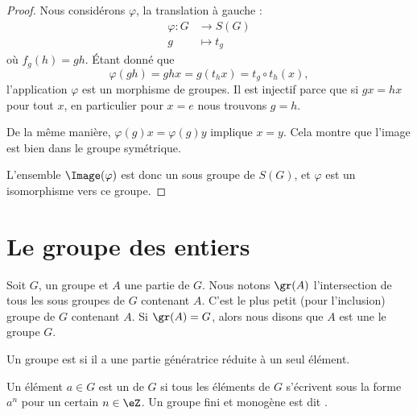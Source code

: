 \begin{proof}
    Nous considérons \( \varphi\), la translation à gauche :
    \begin{equation}
        \begin{aligned}
            \varphi\colon G&\to S(G) \\
            g&\mapsto t_g 
        \end{aligned}
    \end{equation}
    où \( f_g(h)=gh\). Étant donné que
    \begin{equation}
        \varphi(gh)= ghx=g(t_hx)=t_g\circ t_h(x),
    \end{equation}
    l'application \( \varphi\) est un morphisme de groupes. Il est injectif parce que si \( gx=hx\) pour tout \( x\), en particulier pour \( x=e\) nous trouvons \( g=h\). 
    
    De la même manière, \( \varphi(g)x=\varphi(g)y\) implique \( x=y\). Cela montre que l'image est bien dans le groupe symétrique.

    L'ensemble \( \Image(\varphi)\) est donc un sous groupe de \( S(G)\), et \( \varphi\) est un isomorphisme vers ce groupe.
\end{proof}

\section{Le groupe des entiers}

\begin{definition}
    Soit \( G\), un groupe et \( A\) une partie de \( G\). Nous notons \( \gr(A)\) l'intersection de tous les sous groupes de \( G\) contenant \( A\). C'est le plus petit (pour l'inclusion) groupe de \( G\) contenant \( A\). Si \( \gr(A)=G\), alors nous disons que \( A\) est une  le groupe \( G\).

    Un groupe est  si il a une partie génératrice réduite à un seul élément.

    Un élément \( a\in G\) est un  de \( G\) si tous les éléments de \( G\) s'écrivent sous la forme \( a^n\) pour un certain \( n\in\eZ\). Un groupe fini et monogène est dit .
\end{definition}

